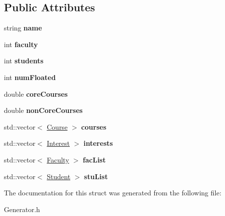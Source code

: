 \subsection*{Public Attributes}
\begin{DoxyCompactItemize}
\item 
\hypertarget{struct_department_a914dfcfd923227e55273099dc59e3aff}{string {\bfseries name}}\label{struct_department_a914dfcfd923227e55273099dc59e3aff}

\item 
\hypertarget{struct_department_af616f37953baa96181d9fad1742fdd68}{int {\bfseries faculty}}\label{struct_department_af616f37953baa96181d9fad1742fdd68}

\item 
\hypertarget{struct_department_ae31c5184fddfea23d6df978fa1a9ef7f}{int {\bfseries students}}\label{struct_department_ae31c5184fddfea23d6df978fa1a9ef7f}

\item 
\hypertarget{struct_department_ae720681a7690bf30689683c0e53cf656}{int {\bfseries num\-Floated}}\label{struct_department_ae720681a7690bf30689683c0e53cf656}

\item 
\hypertarget{struct_department_a2018b1aff3361028acd42dcb47473d29}{double {\bfseries core\-Courses}}\label{struct_department_a2018b1aff3361028acd42dcb47473d29}

\item 
\hypertarget{struct_department_a6334370ec5a4f8f697d2f35d2ad50459}{double {\bfseries non\-Core\-Courses}}\label{struct_department_a6334370ec5a4f8f697d2f35d2ad50459}

\item 
\hypertarget{struct_department_ac7a58dedfb7919b8404b89c846ba8a6a}{std\-::vector$<$ \hyperlink{struct_course}{Course} $>$ {\bfseries courses}}\label{struct_department_ac7a58dedfb7919b8404b89c846ba8a6a}

\item 
\hypertarget{struct_department_ae881cd99ef51b7899a86a161488f4634}{std\-::vector$<$ \hyperlink{struct_interest}{Interest} $>$ {\bfseries interests}}\label{struct_department_ae881cd99ef51b7899a86a161488f4634}

\item 
\hypertarget{struct_department_a56c9481054be3f0c39a0053a6f16faee}{std\-::vector$<$ \hyperlink{struct_faculty}{Faculty} $>$ {\bfseries fac\-List}}\label{struct_department_a56c9481054be3f0c39a0053a6f16faee}

\item 
\hypertarget{struct_department_adaf8337a880092062a74f6129feb61c7}{std\-::vector$<$ \hyperlink{struct_student}{Student} $>$ {\bfseries stu\-List}}\label{struct_department_adaf8337a880092062a74f6129feb61c7}

\end{DoxyCompactItemize}


The documentation for this struct was generated from the following file\-:\begin{DoxyCompactItemize}
\item 
Generator.\-h\end{DoxyCompactItemize}
